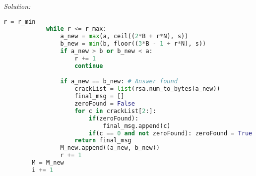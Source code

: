 \documentclass[a4paper, 11pt]{article}
\newenvironment{solution}
    {\textit{Solution:}}
    {}
\begin{document}
\begin{solution}
\begin{lstlisting}[language=Python, caption=Bleichenbacher's attack]
            r = r_min
            while r <= r_max:
                a_new = max(a, ceil((2*B + r*N), s))
                b_new = min(b, floor((3*B - 1 + r*N), s))
                if a_new > b or b_new < a:
                    r += 1
                    continue

                if a_new == b_new: # Answer found
                    crackList = list(rsa.num_to_bytes(a_new))
                    final_msg = []
                    zeroFound = False
                    for c in crackList[2:]:
                        if(zeroFound):
                            final_msg.append(c)
                        if(c == 0 and not zeroFound): zeroFound = True
                    return final_msg
                M_new.append((a_new, b_new))
                r += 1
        M = M_new
        i += 1
    \end{lstlisting}

        
\end{solution}
\end{document}
